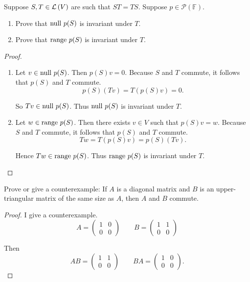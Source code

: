 \begin{exercise}\label{chapter5:sectionE:exercise3}
    Suppose $S, T\in\mathcal{L}\left({V}\right)$ are such that $ST = TS$. Suppose $p\in \mathscr{P}(\mathbb{F})$.
    \begin{enumerate}[label={(\alph*)}]
        \item Prove that $\operatorname{null}\,{p(S)}$ is invariant under $T$.
        \item Prove that $\operatorname{range}\,{p(S)}$ is invariant under $T$.
    \end{enumerate}
\end{exercise}

\begin{proof}
    \begin{enumerate}[label={(\alph*)}]
        \item Let $v\in \operatorname{null}\,{p(S)}$. Then $p(S)v = 0$. Because $S$ and $T$ commute, it follows that $p(S)$ and $T$ commute.
              \[
                  p(S)(Tv) = T(p(S)v) = 0.
              \]

              So $Tv\in\operatorname{null}\,{p(S)}$. Thus $\operatorname{null}\,{p(S)}$ is invariant under $T$.
        \item Let $w\in \operatorname{range}\,{p(S)}$. Then there exists $v\in V$ such that $p(S)v = w$. Because $S$ and $T$ commute, it follows that $p(S)$ and $T$ commute.
              \[
                  Tw = T(p(S)v) = p(S)(Tv).
              \]

              Hence $Tw\in \operatorname{range}\,{p(S)}$. Thus $\operatorname{range}\,{p(S)}$ is invariant under $T$.
    \end{enumerate}
\end{proof}
\newpage

\begin{exercise}
    Prove or give a counterexample: If $A$ is a diagonal matrix and $B$ is an upper-triangular matrix of the same size as $A$, then $A$ and $B$ commute.
\end{exercise}

\begin{proof}
    I give a counterexample.
    \[
        A = \begin{pmatrix}
            1 & 0 \\
            0 & 0
        \end{pmatrix}\qquad
        B = \begin{pmatrix}
            1 & 1 \\
            0 & 0
        \end{pmatrix}
    \]

    Then
    \[
        AB = \begin{pmatrix}
            1 & 1 \\
            0 & 0
        \end{pmatrix}\qquad
        BA = \begin{pmatrix}
            1 & 0 \\
            0 & 0
        \end{pmatrix}.
    \]
\end{proof}
\newpage

